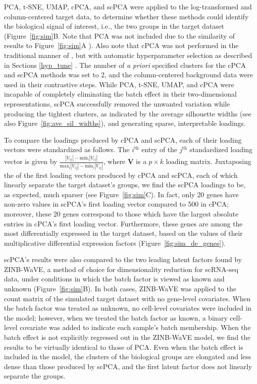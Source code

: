 PCA, t-SNE, UMAP, cPCA, and scPCA were applied to the log-transformed and column-centered target data, to determine whether these methods could identify the biological signal of interest, i.e., the two groups in the target dataset (Figure~\ref{fig:sim}B. Note that PCA was not included due to the similarity of results to Figure~\ref{fig:sim}A ). Also note that cPCA was not performed in the traditional manner of \citet{Abid2018}, but with automatic hyperparameter selection as described in Sections \ref{hyp_tune} . The number of \textit{a priori} specified clusters for the cPCA and scPCA methods was set to 2, and the column-centered background data were used in their contrastive steps. While PCA, t-SNE, UMAP,  and cPCA were incapable of completely eliminating the batch effect in their two-dimensional representations, scPCA successfully removed the unwanted variation while producing the tightest clusters, as indicated by the average silhouette widths (see also Figure~\ref{fig:ave_sil_widths}), and generating sparse, interpretable loadings.

To compare the loadings produced by cPCA and scPCA, each of their loading vectors were standardized as follows. The $i^{\text{th}}$ entry of the $j^{\text{th}}$ standardized loading vector is given by 
$
\frac{|V_{ij}| - \text{min}_i |V_{ij}|}{\text{max}_i |V_{ij}| - \text{min}_i |V_{ij}|}
$, 
where $\mathbf{V}$ is a $p \times k$ loading matrix. 
Juxtaposing the  of the first loading vectors produced by cPCA and scPCA, each of which linearly separate the target dataset's groups, we find the scPCA loadings to be, as expected, much sparser (see Figure~\ref{fig:sim}C). In fact, only 20 genes have non-zero values in scPCA's first loading vector compared to 500 in cPCA; moreover, these 20 genes correspond to those which have the largest absolute entries in cPCA's first loading vector. Furthermore, these genes are among the most differentially expressed in the target dataset, based on the values of their multiplicative differential expression factors (Figure~\ref{fig:sim_de_genes}).

scPCA's results were also compared to the two leading latent factors found by ZINB-WaVE, a method of choice for dimensionality reduction for scRNA-seq data, under conditions in which the batch factor is viewed as known and unknown (Figure~\ref{fig:sim}B). In both cases, ZINB-WaVE was applied to the count matrix of the simulated target dataset with no gene-level covariates. When the batch factor was treated as unknown, no cell-level covariates were included in the model; however, when we treated the batch factor as known, a binary cell-level covariate was added to indicate each sample's batch membership. When the batch effect is not explicitly regressed out in the ZINB-WaVE model, we find the results to be virtually identical to those of PCA. Even when the batch effect is included in the model, the clusters of the biological groups are elongated and less dense than those produced by scPCA, and the first latent factor does not linearly separate the groups.


